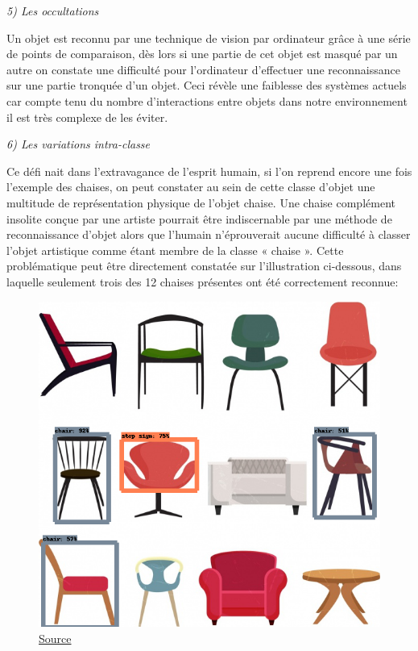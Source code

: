 \documentclass[a4paper,12pt]{article} %
\begin{document}
\textit{5)	Les occultations}\newline

Un objet est reconnu par une technique de vision par ordinateur grâce à une série de points de comparaison, dès lors si une partie de cet objet est masqué par un autre on constate une difficulté pour l’ordinateur d’effectuer une reconnaissance sur une partie tronquée d’un objet. Ceci révèle une faiblesse des systèmes actuels car compte tenu du nombre d’interactions entre objets dans notre environnement il est très complexe de les éviter. \newline

\textit{6)	Les variations intra-classe}\newline

Ce défi nait dans l’extravagance de l’esprit humain, si l’on reprend encore une fois l’exemple des chaises, on peut constater au sein de cette classe d’objet une multitude de représentation physique de l’objet chaise. Une chaise complément insolite conçue par une artiste pourrait être indiscernable par une méthode de reconnaissance d’objet alors que l’humain n’éprouverait aucune difficulté à classer l’objet artistique comme étant membre de la classe « chaise ». Cette problématique peut être directement constatée sur l'illustration ci-dessous, dans laquelle seulement trois des 12 chaises présentes ont été correctement reconnue:\newline
\begin{figure}[h] %
  \centering %
  \includegraphics[scale=0.27]{chairAfterReco.png} %
  \caption{\href{ http://gofreedownload.net/free-vector/vector-abstract/furniture-chairs-icons-collection-various-colored-types-263171/}{Source} }
\end{figure}
\newpage
\end{document}
